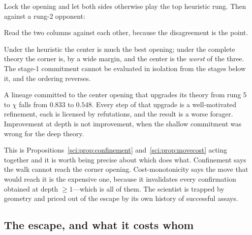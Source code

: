 Lock the opening and let both sides otherwise play the top heuristic rung. Then
against a rung-2 opponent:

\begin{center}
\end{center}

Read the two columns against each other, because the disagreement is the point.

\begin{observation}\label{gam:best-opening-property-game}
Under the heuristic the center is much the best opening; under the complete
theory the corner is, by a wide margin, and the center is the \emph{worst} of
the three. The stage-1 commitment cannot be evaluated in isolation from the
stages below it, and the ordering reverses.
\end{observation}

\begin{corollary}\label{gam:deepening-within-ball-can}
A lineage committed to the center opening that upgrades its theory from rung 5
to $\chi$ falls from $0.833$ to $0.548$. Every step of that upgrade is a
well-motivated refinement, each is licensed by refutations, and the result is a
worse forager. Improvement at depth is not improvement, when the shallow
commitment was wrong for the deep theory.
\end{corollary}

This is Propositions~\ref{sci:prop:confinement} and~\ref{sci:prop:movecost} acting together and it is worth being
precise about which does what. Confinement says the walk cannot reach the corner
opening. Cost-monotonicity says the move that would reach it is the expensive
one, because it invalidates every confirmation obtained at depth $\ge 1$---which
is all of them. The scientist is trapped by geometry and priced out of the
escape by its own history of successful assays.

\subsection{The escape, and what it costs whom}\label{gam:S9.3}

